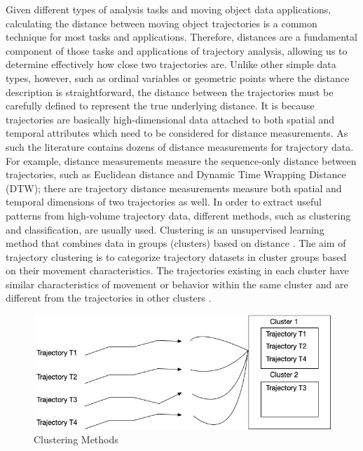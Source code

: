 \documentclass[a4paper, 12pt]{article}
\begin{document}
Given different types of analysis tasks and moving object data applications, calculating the distance between moving object trajectories is a common technique for most tasks and applications. Therefore, distances are a fundamental component of those tasks and applications of trajectory analysis, allowing us to determine effectively how close two trajectories are. Unlike other simple data types, however, such as ordinal variables or geometric points where the distance description is straightforward, the distance between the trajectories must be carefully defined to represent the true underlying distance. It is because trajectories are basically high-dimensional data attached to both spatial and temporal attributes which need to be considered for distance measurements. As such the literature contains dozens of distance measurements for trajectory data. For example, distance measurements measure the sequence-only distance between trajectories, such as Euclidean distance and Dynamic Time Wrapping Distance (DTW); there are trajectory distance measurements measure both spatial and temporal dimensions of two trajectories as well.
In order to extract useful patterns from high-volume trajectory data, different methods, such as clustering and classification, are usually used. Clustering is an unsupervised learning method that combines data in groups (clusters) based on distance \citep{han2011data,xu2005survey}. The aim of trajectory clustering is to categorize trajectory datasets in cluster groups based on their movement characteristics. The trajectories existing in each cluster have similar characteristics of movement or behavior within the same cluster and are different from the trajectories in other clusters \citep{berkhin2006survey,besse2015review,yuan2017review}.

\begin{figure}[ht]
    \centering
    \includegraphics[width=1\textwidth]{Cluster Methods.png}
    \caption{Clustering Methods}
    \label{fig2}
\end{figure}
\end{document}
